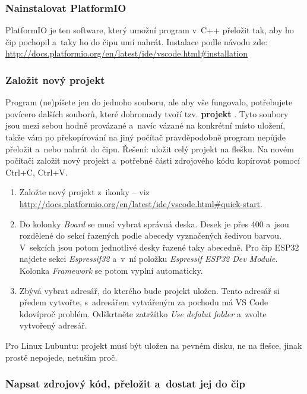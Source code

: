 \label{platformio} \subsubsection{Nainstalovat PlatformIO}

 PlatformIO je ten software, který umožní program v~C++ přeložit tak, aby ho čip pochopil a~taky ho do čipu umí nahrát. 
Instalace podle návodu zde: \url{http://docs.platformio.org/en/latest/ide/vscode.html\#installation}


\subsubsection{Založit nový projekt}

Program (ne)píšete jen do jednoho souboru, ale aby vše fungovalo, 
potřebujete povícero dalších souborů, které dohromady tvoří tzv. {\bf projekt }.
Tyto soubory jsou mezi sebou hodně provázané a~navíc vázané na konkrétní místo uložení, 
takže vám po překopírování na jiný počítač pravděpodobně program nepůjde přeložit a~nebo 
nahrát do čipu. Řešení: uložit celý projekt na flešku. 
Na novém počítači založit nový projekt a~potřebné části zdrojového kódu kopírovat pomocí Ctrl+C, Ctrl+V. 

\begin{enumerate}
\item  Založte nový projekt z~ikonky  -- viz \url{http://docs.platformio.org/en/latest/ide/vscode.html\#quick-start}.
\item  Do kolonky {\it Board} se musí vybrat správná deska. Desek je přes 400 a~jsou rozdělené do sekcí řazených podle abecedy vyznačených šedivou barvou. V~sekcích jsou potom jednotlivé desky řazené taky abecedně. 
Pro čip ESP32 najdete sekci {\it Espressif32} a~v~ní položku {\it Espressif ESP32 Dev Module}. Kolonka {\it Framework } se potom vyplní automaticky. 
\item  Zbývá vybrat adresář, do kterého bude projekt uložen. Tento adresář si předem vytvořte, s~adresářem vytvářeným za pochodu má VS Code kdovíproč problém. Odškrtněte zatržítko {\it Use defalut folder} a~zvolte vytvořený adresář.  
\end{enumerate}

Pro Linux Lubuntu: projekt musí být uložen na pevném disku, ne na flešce, jinak prostě nepojede, netuším proč.  

\subsubsection{Napsat zdrojový kód, přeložit a~dostat jej do čip}

